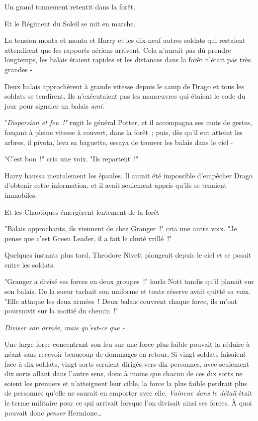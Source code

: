 \later

Un grand tonnement retentit dans la forêt.

Et le Régiment du Soleil se mit en marche.

\later

La tension monta et monta et Harry et les dix-neuf autres soldats qui restaient attendirent que les rapports aériens arrivent. Cela n'aurait pas dû prendre longtemps, les balais étaient rapides et les distances dans la forêt n'était pas très grandes -

Deux balais approchèrent à grande vitesse depuis le camp de Drago et tous les soldats se tendirent. Ils n'exécutaient pas les manœuvres qui étaient le code du jour pour signaler un balais \emph{ami}.

"\emph{Dispersion et feu~!"} rugit le général Potter, et il accompagna ses mots de gestes, fonçant à pleine vitesse à couvert, dans la forêt~; puis, dès qu'il eut atteint les arbres, il pivota, leva sa baguette, essaya de trouver les balais dans le ciel -

"C'est bon~!" cria une voix. "Ils repartent~!"

Harry haussa mentalement les épaules. Il aurait été impossible d'empêcher Drago d'obtenir cette information, et il avait seulement appris qu'ils se tenaient immobiles.

Et les Chaotiques émergèrent lentement de la forêt -

"Balais approchants, ils viennent de chez Granger~!" cria une autre voix. "Je pense que c'est Green Leader, il a fait le chuté vrillé~!"

Quelques instants plus tard, Theodore Nivett plongeait depuis le ciel et se posait entre les soldats.

"Granger a divisé ses forces en deux groupes~!" hurla Nott tandis qu'il planait sur son balais. De la sueur tachait son uniforme et toute réserve avait quitté sa voix. "Elle attaque les deux armées~! Deux balais couvrent chaque force, ils m'ont poursuivit sur la moitié du chemin~!"

\emph{Diviser son armée, mais qu'est-ce que -}

Une large force concentrant son feu sur une force plus faible pouvait la réduire à néant sans recevoir beaucoup de dommages en retour. Si vingt soldats faisaient face à dix soldats, vingt sorts seraient dirigés vers dix personnes, avec seulement dix sorts allant dans l'autre sens, donc à moins que chacun de ces dix sorts ne soient les premiers et n'atteignent leur cible, la force la plus faible perdrait plus de personnes qu'elle ne saurait en emporter avec elle. \emph{Vaincue dans le détail} était le terme militaire pour ce qui arrivait lorsque l'on divisait ainsi ses forces. À quoi pouvait donc \emph{penser} Hermione…

